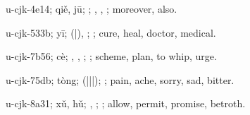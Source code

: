 \begin{multicols}{2}
{\cjkgGlue{}u-cjk-4e14; qiě, jū; \cjkgGlue{}\cjkgGlue{}\cjkgGlue{}; \cjkgGlue{}, \cjkgGlue{}, \cjkgGlue{}; moreover, also.

\cjkgGlue{}u-cjk-533b; yī; \cjkgGlue{}\cjkgGlue{}(\cjkgGlue{}|\cjkgGlue{}), \cjkgGlue{}; \cjkgGlue{}; cure, heal, doctor, medical.

\cjkgGlue{}u-cjk-7b56; cè; \cjkgGlue{}, \cjkgGlue{}, \cjkgGlue{}; \cjkgGlue{}; scheme, plan, to whip, urge.

\cjkgGlue{}u-cjk-75db; tòng; \cjkgGlue{}\cjkgGlue{}(\cjkgGlue{}|\cjkgGlue{}|\cjkgGlue{}|\cjkgGlue{}); \cjkgGlue{}; pain, ache, sorry, sad, bitter.

\cjkgGlue{}u-cjk-8a31; xǔ, hǔ; \cjkgGlue{}\cjkgGlue{}\cjkgGlue{}, \cjkgGlue{}; \cjkgGlue{}; allow, permit, promise, betroth.

}
\end{multicols}
